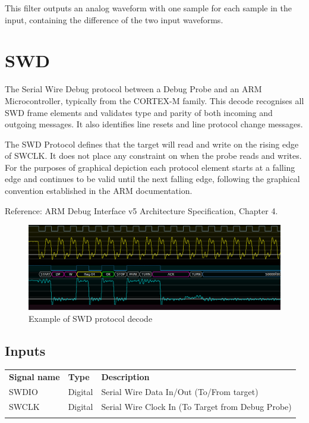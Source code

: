 This filter outputs an analog waveform with one sample for each sample in the input, containing the difference of the
two input waveforms.

\pagebreak
\section{SWD}

The Serial Wire Debug protocol between a Debug Probe and an ARM Microcontroller, typically from the CORTEX-M family. This
decode recognises all SWD frame elements and validates type and parity of both incoming and outgoing messages. It also
identifies line resets and line protocol change messages.

The SWD Protocol defines that the target will read and write on the rising edge of SWCLK. It does not place any constraint
on when the probe reads and writes. For the purposes of graphical depiction each protocol element starts at a falling edge
and continues to be valid until the next falling edge, following the graphical convention established in the ARM documentation.

Reference: ARM Debug Interface v5 Architecture Specification, Chapter 4.

\begin{figure}[h]
\centering
\includegraphics[width=16cm]{images/filters/swd.png}
\caption{Example of SWD protocol decode}
\label{swd_example}
\end{figure}

\subsection{Inputs}

\begin{tabularx}{16cm}{llX}
\thickhline
\textbf{Signal name} & \textbf{Type} & \textbf{Description} \\
\thickhline
SWDIO & Digital & Serial Wire Data In/Out (To/From target)\\
SWCLK & Digital & Serial Wire Clock In (To Target from Debug Probe)\\
\thickhline
\end{tabularx}

